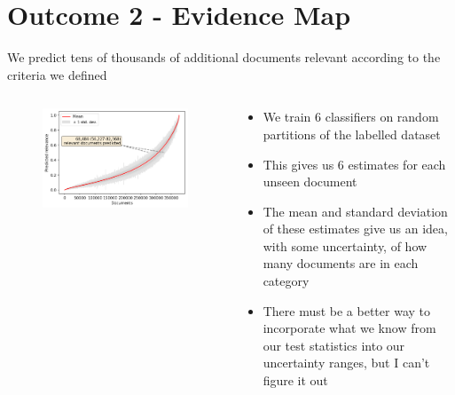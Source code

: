 \documentclass[9pt]{beamer}
\begin{document}
\section{Outcome 2 - Evidence Map}
\begin{frame}
\tableofcontents[currentsection]
\end{frame}

\begin{frame}{We predict tens of thousands of additional documents relevant according to the criteria we defined}

	\begin{columns}
		\begin{column}{0.618\linewidth}
			\begin{figure}
				\includegraphics[width=\linewidth]{../plots/prediction_models/predictions_unseen.png}
			\end{figure}
		\end{column}
		\begin{column}{0.382\linewidth}
			\begin{itemize}
				\item We train 6 classifiers on random partitions of the labelled dataset
				\item This gives us 6 estimates for each unseen document
				\item The mean and standard deviation of these estimates give us an idea, with some uncertainty, of how many documents are in each category
				\item There must be a better way to incorporate what we know from our test statistics into our uncertainty ranges, but I can't figure it out
			\end{itemize}
		\end{column}
	\end{columns}

\end{frame}
\end{document}
